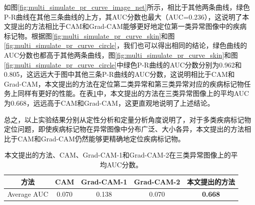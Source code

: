 如图\ref{fig:multi_simulate_pr_curve_image_net}所示，相比于其他两条曲线，绿色P-R曲线在其他三条曲线的上方，其AUC分数也最大（AUC=0.236），这说明了本文提出的方法相比于CAM和Grad-CAM能够更好地定位第一类异常图像中的疾病标记物。根据图\ref{fig:multi_simulate_pr_curve_skin}和图\ref{fig:multi_simulate_pr_curve_circle}，我们也可以得出相同的结论，绿色曲线的AUC分数也都高于其他两条曲线，图\ref{fig:multi_simulate_pr_curve_skin}和图\ref{fig:multi_simulate_pr_curve_circle}中绿色P-R曲线的AUC分数分别为0.962和0.805，这远远大于图中其他三条P-R曲线的AUC分数，这说明相比于CAM和Grad-CAM，本文提出的方法在定位第二类异常和第三类异常对应的疾病标记物任务上同样有更好的性能。在表\ref{tab:multi_ds_auc_scores}中，本文提出的方法在三类异常图像上的平均AUC为0.668，远远高于CAM和Grad-CAM，这更直观地说明了上述结论。

总之，以上实验结果分别从定性分析和定量分析角度说明了，对于多类疾病标记物定位问题，即使疾病标记物在异常图像中分布广泛、大小各异，本文提出的方法相比于CAM和Grad-CAM仍然能够更精确地定位疾病标记物。
\begin{table}[!htbp]
	\centering
	\caption[三种疾病标记物定位方法在三类异常图像上的平均AUC分数]{本文提出的方法、CAM、Grad-CAM-1和Grad-CAM-2在三类异常图像上的平均AUC分数。}
	\label{tab:multi_ds_auc_scores}
	\begin{tabular}{c|c|c|c|c}
		\toprule[2pt]
		方法 & CAM & Grad-CAM-1 & Grad-CAM-2 & 本文提出的方法 \\
		\midrule[2pt]
		Average AUC & 0.070 & 0.138 & 0.070 & \textbf{0.668} \\
		\bottomrule[2pt]
	\end{tabular}
\end{table}
\vspace{-0.7cm}
